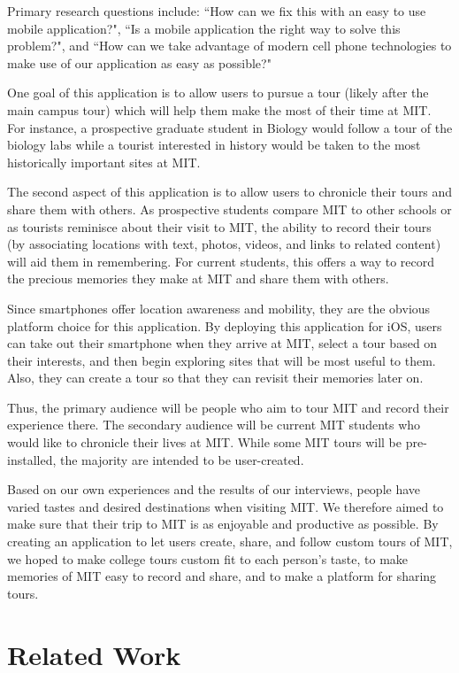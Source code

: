 \documentclass{sigchi}
\begin{document}
Primary research questions include: ``How can we fix this with an easy to use mobile application?", ``Is a mobile application the right way to solve this problem?", and ``How can we take advantage of modern cell phone technologies to make use of our application as easy as possible?"

One goal of this application is to allow users to pursue a tour (likely after the main campus tour) which will help them make the most of their time at MIT. For instance, a prospective graduate student in Biology would follow a tour of the biology labs while a tourist interested in history would be taken to the most historically important sites at MIT. 

The second aspect of this application is to allow users to chronicle their tours and share them with others. As prospective students compare MIT to other schools or as tourists reminisce about their visit to MIT, the ability to record their tours (by associating locations with text, photos, videos, and links to related content) will aid them in remembering. For current students, this offers a way to record the precious memories they make at MIT and share them with others.

Since smartphones offer location awareness and mobility, they are the obvious platform choice for this application. By deploying this application for iOS, users can take out their smartphone when they arrive at MIT, select a tour based on their interests, and then begin exploring sites that will be most useful to them. Also, they can create a tour so that they can revisit their memories later on. 

Thus, the primary audience will be people who aim to tour MIT and record their experience there. The secondary audience will be current MIT students who would like to chronicle their lives at MIT. While some MIT tours will be pre-installed, the majority are intended to be user-created. 

Based on our own experiences and the results of our interviews, people have varied tastes and desired destinations when visiting MIT. We therefore aimed to make sure that their trip to MIT is as enjoyable and productive as possible. By creating an application to let users create, share, and follow custom tours of MIT, we hoped to make college tours custom fit to each person's taste, to make memories of MIT easy to record and share, and to make a platform for sharing tours.

\section{Related Work}
\end{document}
